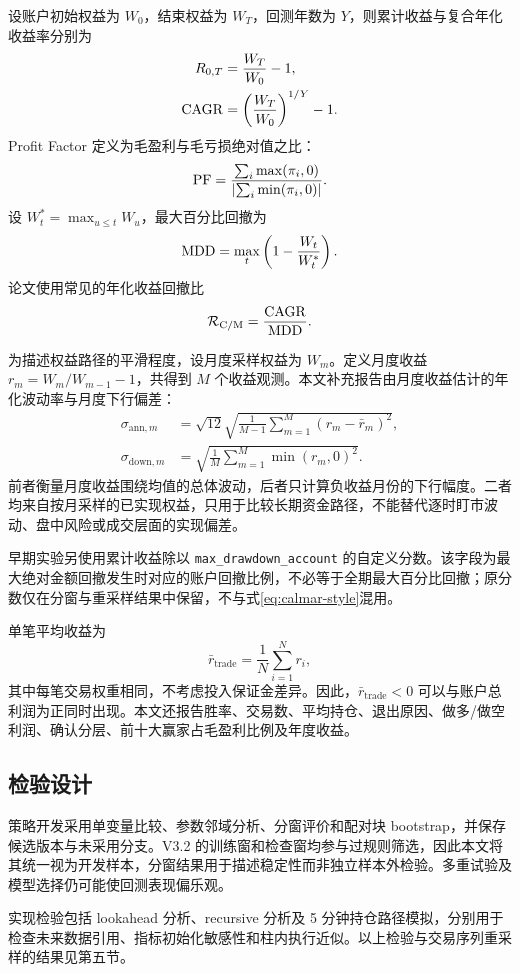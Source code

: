 设账户初始权益为 $W_0$，结束权益为 $W_T$，回测年数为 $Y$，则累计收益与复合年化收益率分别为
\begin{align}
  R_{0,T}&=\frac{W_T}{W_0}-1,\\
  \mathrm{CAGR}&=\left(\frac{W_T}{W_0}\right)^{1/Y}-1.
  \label{eq:cagr}
\end{align}
Profit Factor 定义为毛盈利与毛亏损绝对值之比：
\begin{equation}
  \mathrm{PF}=\frac{\sum_i\max(\pi_i,0)}{\left|\sum_i\min(\pi_i,0)\right|}.
  \label{eq:pf}
\end{equation}
设 $W_t^*=\max_{u\le t}W_u$，最大百分比回撤为
\begin{equation}
  \mathrm{MDD}=\max_t\left(1-\frac{W_t}{W_t^*}\right).
  \label{eq:mdd}
\end{equation}
论文使用常见的年化收益回撤比
\begin{equation}
  \mathcal{R}_{\mathrm{C/M}}=\frac{\mathrm{CAGR}}{\mathrm{MDD}}.
  \label{eq:calmar-style}
\end{equation}

为描述权益路径的平滑程度，设月度采样权益为 $W_m$。定义月度收益
$r_m=W_m/W_{m-1}-1$，共得到 $M$ 个收益观测。本文补充报告由月度收益估计的年化波动率与月度下行偏差：
\begin{align}
  \sigma_{\mathrm{ann},m}
    &=\sqrt{12}\sqrt{\frac{1}{M-1}\sum_{m=1}^{M}(r_m-\bar r_m)^2},\\
  \sigma_{\mathrm{down},m}
    &=\sqrt{\frac{1}{M}\sum_{m=1}^{M}\min(r_m,0)^2}.
  \label{eq:path-risk}
\end{align}
前者衡量月度收益围绕均值的总体波动，后者只计算负收益月份的下行幅度。二者均来自按月采样的已实现权益，只用于比较长期资金路径，不能替代逐时盯市波动、盘中风险或成交层面的实现偏差。

早期实验另使用累计收益除以 \texttt{max\_drawdown\_account} 的自定义分数。该字段为最大绝对金额回撤发生时对应的账户回撤比例，不必等于全期最大百分比回撤；原分数仅在分窗与重采样结果中保留，不与式\eqref{eq:calmar-style}混用。

单笔平均收益为
\begin{equation}
  \bar r_{\mathrm{trade}}=\frac{1}{N}\sum_{i=1}^{N}r_i,
  \label{eq:mean-trade}
\end{equation}
其中每笔交易权重相同，不考虑投入保证金差异。因此，$\bar r_{\mathrm{trade}}<0$ 可以与账户总利润为正同时出现。本文还报告胜率、交易数、平均持仓、退出原因、做多/做空利润、确认分层、前十大赢家占毛盈利比例及年度收益。

\subsection{检验设计}
\label{sec:validation-design}

策略开发采用单变量比较、参数邻域分析、分窗评价和配对块 bootstrap，并保存候选版本与未采用分支。V3.2 的训练窗和检查窗均参与过规则筛选，因此本文将其统一视为开发样本，分窗结果用于描述稳定性而非独立样本外检验。多重试验及模型选择仍可能使回测表现偏乐观\cite{white2000,hansen2005,bailey2017}。

实现检验包括 lookahead 分析、recursive 分析及 5 分钟持仓路径模拟，分别用于检查未来数据引用、指标初始化敏感性和柱内执行近似\cite{freqtrade_lookahead,freqtrade_recursive}。以上检验与交易序列重采样的结果见第五节。
